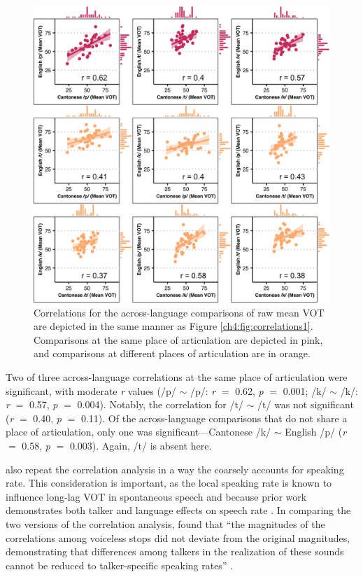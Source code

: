 \begin{figure}[htbp]
  \begin{center}
  \includegraphics[width=0.9\linewidth]{figures/ch4_correlations2_5in.png} 
  \caption{Correlations for the across-language comparisons of raw mean VOT are depicted in the same manner as Figure \ref{ch4:fig:correlations1}. Comparisons at the same place of articulation are depicted in pink, and comparisons at different places of articulation are in orange.} 
  \label{ch4:fig:correlations2}
  \end{center}
\end{figure}

Two of three across-language correlations at the same place of articulation were significant, with moderate \textit{r} values (/p/ $\sim$ /p/: \textit{r} $=$ 0.62, \textit{p} $=$ 0.001; /k/ $\sim$ /k/: \textit{r} $=$ 0.57, \textit{p} $=$ 0.004). Notably, the correlation for /t/ $\sim$ /t/ was not significant (\textit{r} $=$ 0.40, \textit{p} $=$ 0.11). Of the across-language comparisons that do not share a place of articulation, only one was significant---Cantonese /k/ $\sim$ English /p/ (\textit{r} $=$ 0.58, \textit{p} $=$ 0.003). Again, /t/ is absent here.

\citet{chodroff_2017_structure} also repeat the correlation analysis in a way the coarsely accounts for speaking rate. This consideration is important, as the local speaking rate is known to influence long-lag VOT in spontaneous speech \citep{stuartsmith_2015_private} and because prior work demonstrates both talker and language effects on speech rate \citep{bradlow_2017_rate}. In comparing the two versions of the correlation analysis, \citeauthor{chodroff_2017_structure} found that ``the magnitudes of the correlations among voiceless stops did not deviate from the original magnitudes, demonstrating that differences among talkers in the realization of these sounds cannot be reduced to talker-specific speaking rates'' \citeyearpar[][p. 34]{chodroff_2017_structure}. 


